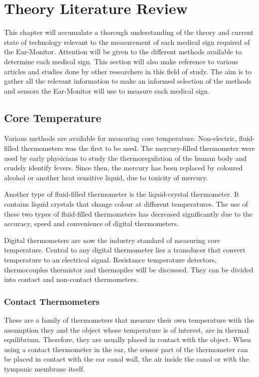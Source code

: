 \chapter{Theory Literature Review}
\label{chp:Theory Literature Review}
This chapter will accumulate a thorough understanding of the theory and current state of technology relevant to the measurement of each medical sign required of the Ear-Monitor. Attention will be given to the different methods available to determine each medical sign. This section will also make reference to various articles and studies done by other researchers in this field of study. The aim is to gather all the relevant information to make an informed selection of the methods and sensors the Ear-Monitor will use to measure each medical sign.

\section{Core Temperature}
Various methods are available for measuring core temperature. Non-electric, fluid-filled thermometers was the first to be used. The mercury-filled thermometer were used by early physicians to study the thermoregulation of the human body and crudely identify fevers. Since then, the mercury has been replaced by coloured alcohol or another heat sensitive liquid, due to toxicity of mercury.

\medskip

Another type of fluid-filled thermometer is the liquid-crystal thermometer. It contains liquid crystals that change colour at different temperatures. The use of these two types of fluid-filled thermometers has decreased significantly due to the accuracy, speed and convenience of digital thermometers.

\medskip

Digital thermometers are now the industry standard of measuring core temperature. Central to any digital thermometer lies a transducer that convert temperature to an electrical signal. Resistance temperature detectors, thermocouples thermistor and thermopiles will be discussed. They can be divided into contact and non-contact thermometers.

\subsection{Contact Thermometers}
These are a family of thermometers that measure their own temperature with the assumption they and the object whose temperature is of interest, are in thermal equilibrium. Therefore, they are usually placed in contact with the object. When using a contact thermometer in the ear, the sensor part of the thermometer can be placed in contact with the ear canal wall, the air inside the canal or with the tympanic membrane itself.

